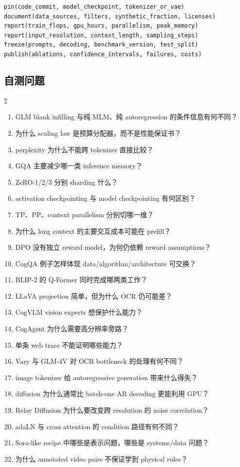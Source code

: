 \begin{lstlisting}[caption={跨 LLM/VLM/diffusion 的统一复现清单}]
pin(code_commit, model_checkpoint, tokenizer_or_vae)
document(data_sources, filters, synthetic_fraction, licenses)
report(train_flops, gpu_hours, parallelism, peak_memory)
report(input_resolution, context_length, sampling_steps)
freeze(prompts, decoding, benchmark_version, test_split)
publish(ablations, confidence_intervals, failures, costs)
\end{lstlisting}

\subsection{自测问题}

\begin{multicols}{2}
\footnotesize
\begin{enumerate}
  \setlength{\itemsep}{0pt}
  \setlength{\parskip}{0pt}
  \item GLM blank infilling 与纯 MLM、纯 autoregression 的条件信息有何不同？
  \item 为什么 scaling law 是预算分配器，而不是性能保证书？
  \item perplexity 为什么不能跨 tokenizer 直接比较？
  \item GQA 主要减少哪一类 inference memory？
  \item ZeRO-1/2/3 分别 sharding 什么？
  \item activation checkpointing 与 model checkpointing 有何区别？
  \item TP、PP、context parallelism 分别切哪一维？
  \item 为什么 long context 的主要交互成本可能在 prefill？
  \item DPO 没有独立 reward model，为何仍依赖 reward assumptions？
  \item CogQA 例子怎样体现 data/algorithm/architecture 可交换？
  \item BLIP-2 的 Q-Former 同时完成哪两类工作？
  \item LLaVA projection 简单，但为什么 OCR 仍可能差？
  \item CogVLM vision experts 想保护什么能力？
  \item CogAgent 为什么需要高分辨率旁路？
  \item 单条 web trace 不能证明哪些能力？
  \item Vary 与 GLM-4V 对 OCR bottleneck 的处理有何不同？
  \item image tokenizer 给 autoregressive generation 带来什么得失？
  \item diffusion 为什么通常比 batch-one AR decoding 更能利用 GPU？
  \item Relay Diffusion 为什么要改变跨 resolution 的 noise correlation？
  \item adaLN 与 cross attention 的 condition 路径有何不同？
  \item Sora-like recipe 中哪些是表示问题，哪些是 systems/data 问题？
  \item 为什么 annotated video pairs 不保证学到 physical rules？
\end{enumerate}
\end{multicols}


